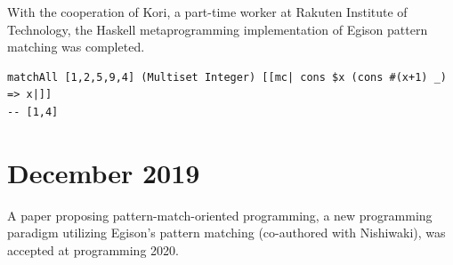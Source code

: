 With the cooperation of Kori, a part-time worker at Rakuten Institute of Technology, the Haskell metaprogramming implementation of Egison pattern matching was completed.
\begin{lstlisting}[language=egison,numbers=none]
matchAll [1,2,5,9,4] (Multiset Integer) [[mc| cons $x (cons #(x+1) _) => x|]]
-- [1,4]
\end{lstlisting}

\section*{December 2019}

A paper proposing pattern-match-oriented programming, a new programming paradigm utilizing Egison's pattern matching (co-authored with Nishiwaki), was accepted at \textlangle{}programming\textrangle{} 2020.
